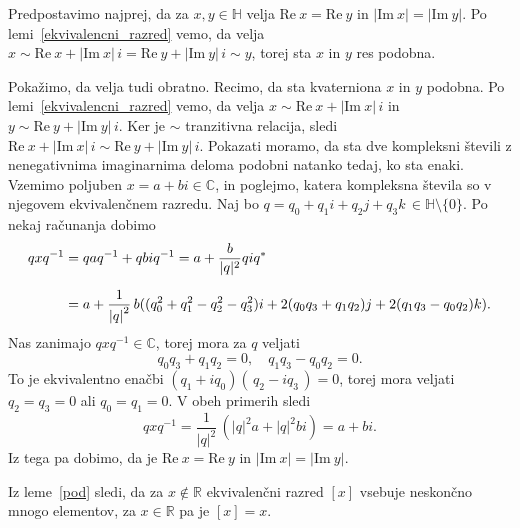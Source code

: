 \documentclass[mat1, tisk]{fmfdelo}
\numberwithin{equation}{section}
\begin{document}
\begin{dokaz}
    Predpostavimo najprej, da za $x, y \in \mathbb{H}$ velja $\mathrm{Re} \: x = \mathrm{Re} \: y$ in $\lvert \mathrm{Im} \: x  \rvert = \lvert \mathrm{Im} \: y  \rvert$.
    Po lemi~\ref{ekvivalencni_razred} vemo, da velja  
    $x \sim  \mathrm{Re} \: x + \lvert \mathrm{Im} \: x  \rvert \, i = \mathrm{Re} \: y + \lvert \mathrm{Im} \: y  \rvert \, i \sim y$, torej sta $x$ in $y$ res podobna.
    
    \medskip
    Pokažimo, da velja tudi obratno. Recimo, da sta kvaterniona $x$ in $y$ podobna. Po lemi~\ref{ekvivalencni_razred} vemo, da velja  
    $x \sim  \mathrm{Re} \: x + \lvert \mathrm{Im} \: x  \rvert \, i$ in $y \sim  \mathrm{Re} \: y + \lvert \mathrm{Im} \: y  \rvert \, i$. Ker
    je $\sim$ tranzitivna relacija, sledi $\mathrm{Re} \: x + \lvert \mathrm{Im} \: x  \rvert \, i \sim \mathrm{Re} \: y + \lvert \mathrm{Im} \: y  \rvert \, i$.
    Pokazati moramo, da sta dve kompleksni števili z nenegativnima imaginarnima deloma podobni natanko tedaj, ko sta enaki. Vzemimo poljuben $x = a + bi \in \mathbb{C}$, in 
    poglejmo, katera kompleksna števila so v njegovem ekvivalenčnem razredu. Naj bo $q = q_0 + q_1 i + q_2 j + q_3 k \, \in \mathbb{H} \setminus \{0\}$. Po nekaj računanja dobimo
    \begin{equation*}
        \setlength{\jot}{10pt}
            \begin{aligned}
                q x q^{-1} &= q a q^{-1} + q bi q^{-1} = a + \frac{b}{|q|^2}qiq^*\\
                        &= a + \frac{1}{{\lvert q \rvert}^2} \, b((q_0^2 + q_1^2 - q_2^2 - q_3^2)i 
                        + 2(q_0 q_3 + q_1 q_2) j + 2(q_1 q_3 - q_0 q_2)k).   
            \end{aligned}
    \end{equation*}
    Nas zanimajo $q x q^{-1} \in \mathbb{C}$, torej mora za $q$ veljati
    $$q_0 q_3 + q_1 q_2 = 0, \quad q_1 q_3 - q_0 q_2 = 0.$$
    To je ekvivalentno enačbi $(q_1 + i q_0)(\,q_2 - i q_3\,) = 0$, torej mora veljati
    $q_2 = q_3 = 0$ ali $q_0 = q_1 = 0$.
    V obeh primerih sledi
    $$q x q^{-1} = \frac{1}{{\lvert q \rvert}^2} \, (\lvert q \rvert^2 a + \lvert q \rvert^2 bi) = a + bi.$$
    Iz tega pa dobimo, da je $\mathrm{Re} \: x = \mathrm{Re} \: y$ in $\lvert \mathrm{Im} \: x  \rvert = \lvert \mathrm{Im} \: y  \rvert$.
\end{dokaz}

\begin{opomba}\label{neskoncno_mnogo_el}
    Iz leme~\ref{pod} sledi, da za $x \notin \mathbb{R}$ ekvivalenčni razred $\left[x\right]$ vsebuje neskončno mnogo elementov, za $x \in \mathbb{R}$
    pa je $\left[x\right] = x$.
\end{opomba}
\end{document}

